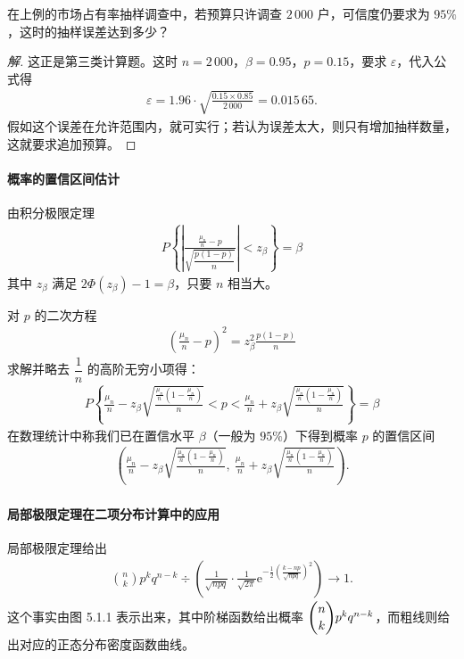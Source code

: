 \documentclass[../../main.tex]{subfiles}
\begin{document}
\begin{example}[抽样误差估计]\label{example:ch05-抽样误差估计}
在上例的市场占有率抽样调查中，若预算只许调查 $2\,000$ 户，可信度仍要求为 $95\%$，这时的抽样误差达到多少？
\end{example}

\begin{proof}[解]
这正是第三类计算题。这时 $n=2\,000$，$\beta=0.95$，$p=0.15$，要求 $\varepsilon$，代入公式得
\begin{align*}
\varepsilon=1.96\cdot\sqrt{\frac{0.15\times0.85}{2\,000}}=0.015\,65.
\end{align*}
假如这个误差在允许范围内，就可实行；若认为误差太大，则只有增加抽样数量，这就要求追加预算。
\end{proof}

\paragraph*{概率的置信区间估计}
由积分极限定理
\begin{align}
P\!\left\{\left|\frac{\frac{\mu_n}{n}-p}{\sqrt{\dfrac{p(1-p)}{n}}}\right|<z_\beta\right\}=\beta
\end{align}
其中 $z_\beta$ 满足 $2\Phi(z_\beta)-1=\beta$，只要 $n$ 相当大。

对 $p$ 的二次方程
\begin{align*}
\left(\frac{\mu_n}{n}-p\right)^{2}=z_\beta^{2}\frac{p(1-p)}{n}
\end{align*}
求解并略去 $\dfrac1n$ 的高阶无穷小项得：
\begin{align}
P\!\left\{\frac{\mu_n}{n}-z_\beta\sqrt{\frac{\frac{\mu_n}{n}\left(1-\frac{\mu_n}{n}\right)}{n}}<p<\frac{\mu_n}{n}+z_\beta\sqrt{\frac{\frac{\mu_n}{n}\left(1-\frac{\mu_n}{n}\right)}{n}}\right\}=\beta
\end{align}
在数理统计中称我们已在置信水平 $\beta$（一般为 $95\%$）下得到概率 $p$ 的置信区间
\begin{align}
\left(\frac{\mu_n}{n}-z_\beta\sqrt{\frac{\frac{\mu_n}{n}\left(1-\frac{\mu_n}{n}\right)}{n}},\ \frac{\mu_n}{n}+z_\beta\sqrt{\frac{\frac{\mu_n}{n}\left(1-\frac{\mu_n}{n}\right)}{n}}\right).
\end{align}

\paragraph*{局部极限定理在二项分布计算中的应用}
局部极限定理给出
\begin{align}
\binom{n}{k}p^{k}q^{n-k}\div\left(\frac{1}{\sqrt{npq}}\cdot\frac{1}{\sqrt{2\pi}}\mathrm{e}^{-\frac12\left(\frac{k-np}{\sqrt{npq}}\right)^{2}}\right)\to 1.
\end{align}
这个事实由图 5.1.1 表示出来，其中阶梯函数给出概率 $\dbinom{n}{k}p^{k}q^{n-k}$，而粗线则给出对应的正态分布密度函数曲线。
\end{document}
